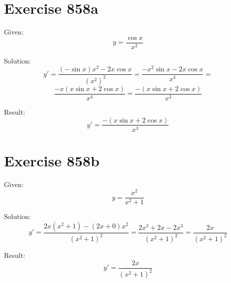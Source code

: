 \documentclass[a4paper, 10pt]{scrartcl}
\begin{document}
\section{Exercise 858a}

Given:
\[
y = \frac{\cos{x}}{x^{2}}
\]

Solution:
\[
y' = \frac{(-\sin{x})x^{2} - 2x\cos{x}}{(x^{2})^{2}} = \frac{-x^{2}\sin{x} - 2x\cos{x}}{x^{4}} =
\]
\[
\frac{-x(x\sin{x} + 2\cos{x})}{x^{4}} = \frac{-(x\sin{x} + 2\cos{x})}{x^{3}}
\]

Result:
\[
y' = \frac{-(x\sin{x} + 2\cos{x})}{x^{3}}
\]

\section{Exercise 858b}

Given:
\[
y = \frac{x^{2}}{x^{2} + 1}
\]

Solution:
\[
y' = \frac{2x(x^{2} + 1) - (2x + 0)x^{2}}{(x^{2} + 1)^{2}} = \frac{2x^{3} + 2x - 2x^{3}}{(x^{2} + 1)^{2}} = \frac{2x}{(x^{2} + 1)^{2}}
\]

Result:
\[
y' = \frac{2x}{(x^{2} + 1)^{2}}
\]
\end{document}
